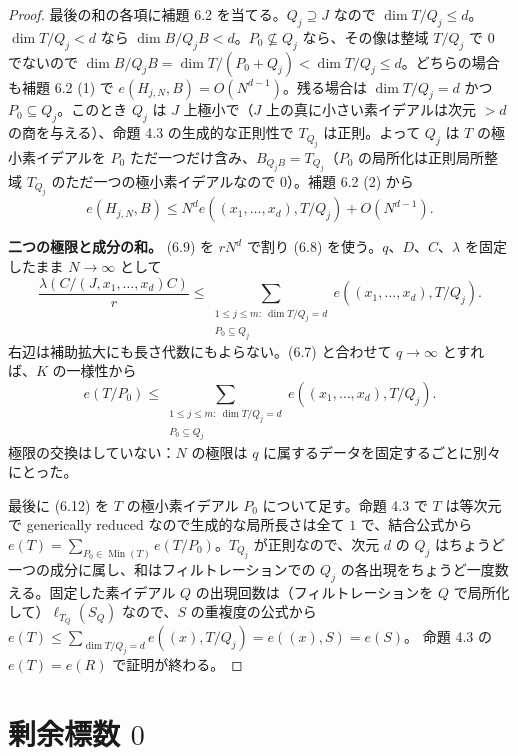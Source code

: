 \documentclass[11pt,a4paper]{ltjsarticle}
\theoremstyle{plain}
\theoremstyle{definition}
\newcommand{\Min}{\operatorname{Min}}
\begin{document}
\begin{proof}
最後の和の各項に補題 6.2 を当てる。$Q_j\supseteq J$ なので $\dim T/Q_j\le d$。$\dim T/Q_j<d$ なら $\dim B/Q_jB<d$。$P_0\not\subseteq Q_j$ なら、その像は整域 $T/Q_j$ で $0$ でないので $\dim B/Q_jB = \dim T/(P_0+Q_j)<\dim T/Q_j\le d$。どちらの場合も補題 6.2 (1) で $e(H_{j,N},B) = O(N^{d-1})$。残る場合は $\dim T/Q_j = d$ かつ $P_0\subseteq Q_j$。このとき $Q_j$ は $J$ 上極小で（$J$ 上の真に小さい素イデアルは次元 $>d$ の商を与える）、命題 4.3 の生成的な正則性で $T_{Q_j}$ は正則。よって $Q_j$ は $T$ の極小素イデアルを $P_0$ ただ一つだけ含み、$B_{Q_jB} = T_{Q_j}$（$P_0$ の局所化は正則局所整域 $T_{Q_j}$ のただ一つの極小素イデアルなので $0$）。補題 6.2 (2) から
\begin{equation}\tag{6.10}
  e(H_{j,N},B)\le N^de((x_1,\dots,x_d),T/Q_j)+O(N^{d-1}).
\end{equation}

\textbf{二つの極限と成分の和。} (6.9) を $rN^d$ で割り (6.8) を使う。$q$、$D$、$C$、$\lambda$ を固定したまま $N\to\infty$ として
\begin{equation}\tag{6.11}
  \frac{\lambda(C/(J,x_1,\dots,x_d)C)}{r}\le\sum_{\substack{1\le j\le m:\ \dim T/Q_j = d\\ P_0\subseteq Q_j}}e((x_1,\dots,x_d),T/Q_j).
\end{equation}
右辺は補助拡大にも長さ代数にもよらない。(6.7) と合わせて $q\to\infty$ とすれば、$K$ の一様性から
\begin{equation}\tag{6.12}
  e(T/P_0)\le\sum_{\substack{1\le j\le m:\ \dim T/Q_j = d\\ P_0\subseteq Q_j}}e((x_1,\dots,x_d),T/Q_j).
\end{equation}
極限の交換はしていない：$N$ の極限は $q$ に属するデータを固定するごとに別々にとった。

最後に (6.12) を $T$ の極小素イデアル $P_0$ について足す。命題 4.3 で $T$ は等次元で generically reduced なので生成的な局所長さは全て $1$ で、結合公式から $e(T) = \sum_{P_0\in\Min(T)}e(T/P_0)$。$T_{Q_j}$ が正則なので、次元 $d$ の $Q_j$ はちょうど一つの成分に属し、和はフィルトレーションでの $Q_j$ の各出現をちょうど一度数える。固定した素イデアル $Q$ の出現回数は（フィルトレーションを $Q$ で局所化して）$\ell_{T_Q}(S_Q)$ なので、$S$ の重複度の公式から
$e(T)\le\sum_{\dim T/Q_j = d}e((x),T/Q_j) = e((x),S) = e(S)$。
命題 4.3 の $e(T) = e(R)$ で証明が終わる。
\end{proof}

\section{剰余標数 $0$}\label{sec:charzero}
\end{document}
